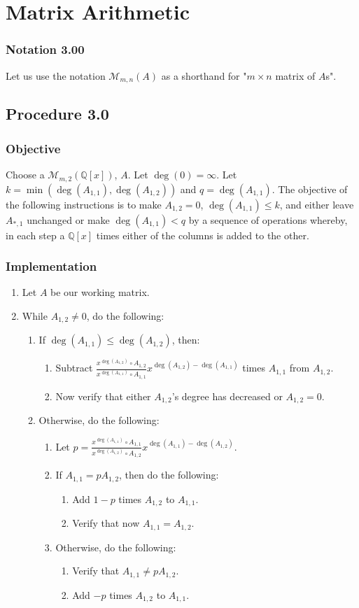 \documentclass[twocolumn]{article}
\newcommand{\notation}[1]{\subsubsection*{Notation #1}}
\newcommand{\procedure}[2][]{\subsection*{Procedure #2 \ifthenelse{\equal{#1}{}}{}{(#1)}}\label{sec:procedure #2}}
\newcommand{\objective}{\subsubsection*{Objective}}
\newcommand{\implementation}{\subsubsection*{Implementation}}
\begin{document}
	\section{Matrix Arithmetic}
		\notation{3.00}
			Let us use the notation $\mathcal{M}_{m,n}(A)$ as a shorthand for "$m\times n$ matrix of $A$s".
		\procedure{3.0}
			\objective
				Choose a $\mathcal{M}_{m,2}(\mathbb{Q}[x])$, $A$. Let $\deg(0)=\infty$. Let $k=\min(\deg(A_{1,1}),\deg(A_{1,2}))$ and $q=\deg(A_{1,1})$. The objective of the following instructions is to make $A_{1,2}=0$, $\deg(A_{1,1})\le k$, and either leave $A_{*,1}$ unchanged or make $\deg(A_{1,1})<q$ by a sequence of operations whereby, in each step a $\mathbb{Q}[x]$ times either of the columns is added to the other.
			\implementation
				\begin{enumerate}
					\item Let $A$ be our working matrix.
					\item While $A_{1,2}\ne 0$, do the following:
					\begin{enumerate}
						\item If $\deg(A_{1,1})\le\deg(A_{1,2})$, then:
						\begin{enumerate}
							\item Subtract $\frac{x^{\deg(A_{1,2})}\circ A_{1,2}}{x^{\deg(A_{1,1})}\circ A_{1,1}}x^{\deg(A_{1,2})-\deg(A_{1,1})}$ times $A_{1,1}$ from $A_{1,2}$.
							\item Now verify that either $A_{1,2}$'s degree has decreased or $A_{1,2}=0$.
						\end{enumerate}
						\item Otherwise, do the following:
						\begin{enumerate}
							\item Let $p=\frac{x^{\deg(A_{1,1})}\circ A_{1,1}}{x^{\deg(A_{1,2})}\circ A_{1,2}}x^{\deg(A_{1,1})-\deg(A_{1,2})}$.
							\item If $A_{1,1}=pA_{1,2}$, then do the following:
							\begin{enumerate}
								\item Add $1-p$ times $A_{1,2}$ to $A_{1,1}$.
								\item Verify that now $A_{1,1}=A_{1,2}$.
							\end{enumerate}
							\item Otherwise, do the following:
							\begin{enumerate}
								\item Verify that $A_{1,1}\ne pA_{1,2}$.
								\item Add $-p$ times $A_{1,2}$ to $A_{1,1}$.

\end{enumerate}
\end{enumerate}
\end{enumerate}
\end{enumerate}
\end{document}
